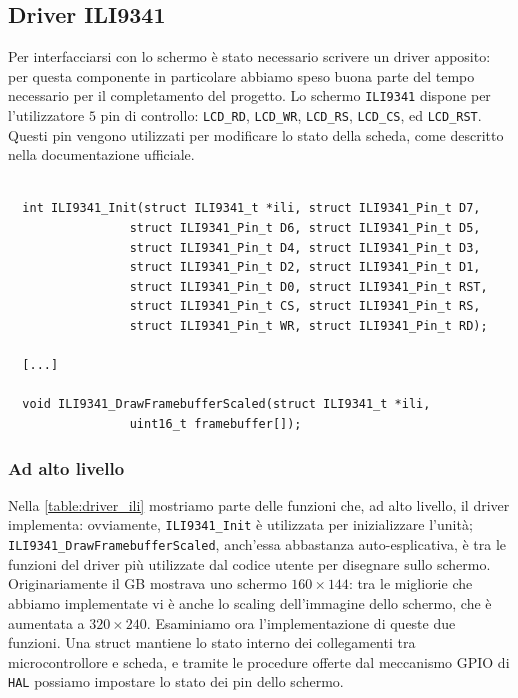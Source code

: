 \documentclass[hidelinks,12pt]{article}
\begin{document}
\subsection{Driver ILI9341}
Per interfacciarsi con lo schermo è stato necessario scrivere un driver
apposito: per questa componente in particolare abbiamo speso buona parte del
tempo necessario per il completamento del progetto. Lo schermo \texttt{ILI9341}
dispone per l'utilizzatore $5$ pin di controllo: \texttt{LCD\_RD},
\texttt{LCD\_WR}, \texttt{LCD\_RS}, \texttt{LCD\_CS}, ed \texttt{LCD\_RST}.
Questi pin vengono utilizzati per modificare lo stato della scheda, come
descritto nella documentazione ufficiale.
\begin{table}[h]
	\begin{verbatim}

  int ILI9341_Init(struct ILI9341_t *ili, struct ILI9341_Pin_t D7,
                 struct ILI9341_Pin_t D6, struct ILI9341_Pin_t D5,
                 struct ILI9341_Pin_t D4, struct ILI9341_Pin_t D3,
                 struct ILI9341_Pin_t D2, struct ILI9341_Pin_t D1,
                 struct ILI9341_Pin_t D0, struct ILI9341_Pin_t RST,
                 struct ILI9341_Pin_t CS, struct ILI9341_Pin_t RS,
                 struct ILI9341_Pin_t WR, struct ILI9341_Pin_t RD);

  [...]

  void ILI9341_DrawFramebufferScaled(struct ILI9341_t *ili, 
                 uint16_t framebuffer[]);
  \end{verbatim}
	\caption{}
	\label{table:driver_ili}
\end{table}
\subsubsection{Ad alto livello}
Nella \cref{table:driver_ili} mostriamo parte delle funzioni che, ad alto
livello, il driver implementa: ovviamente, \texttt{ILI9341\_Init} è utilizzata
per inizializzare l'unità; \texttt{ILI9341\_DrawFramebufferScaled}, anch'essa
abbastanza auto-esplicativa, è tra le funzioni del driver più utilizzate dal
codice utente per disegnare sullo schermo. Originariamente il GB mostrava uno
schermo $160\times144$: tra le migliorie che abbiamo implementate vi è anche lo
scaling dell'immagine dello schermo, che è aumentata a $320\times240$.
Esaminiamo ora l'implementazione di queste due funzioni. Una struct mantiene lo
stato interno dei collegamenti tra microcontrollore e scheda, e tramite le
procedure offerte dal meccanismo GPIO di \texttt{HAL} possiamo impostare lo
stato dei pin dello schermo.
\end{document}
